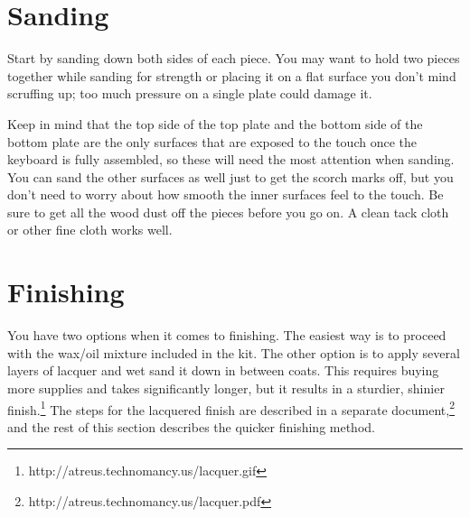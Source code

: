 \documentclass{article}
\begin{document}
\section{Sanding}

Start by sanding down both sides of each piece. You may want to
hold two pieces together while sanding for strength or placing it on a
flat surface you don't mind scruffing up; too much pressure on a
single plate could damage it.

\vspace{1em}
\noindent{}
\vspace{1em}

Keep in mind that the top side of the top plate and the bottom side of
the bottom plate are the only surfaces that are exposed to the touch
once the keyboard is fully assembled, so these will need the most
attention when sanding. You can sand the other surfaces as well just
to get the scorch marks off, but you don't need to worry about how
smooth the inner surfaces feel to the touch. Be sure to get all the
wood dust off the pieces before you go on. A clean tack cloth or other
fine cloth works well.

\section{Finishing}


You have two options when it comes to finishing. The easiest way is to
proceed with the wax/oil mixture included in the kit. The other option
is to apply several layers of lacquer and wet sand it down in
between coats. This requires buying more supplies and takes significantly
longer, but it results in a sturdier, shinier
finish.\footnote{http://atreus.technomancy.us/lacquer.gif} The steps
for the lacquered finish are described in a separate
document,\footnote{http://atreus.technomancy.us/lacquer.pdf} and the
rest of this section describes the quicker finishing method.
\end{document}
